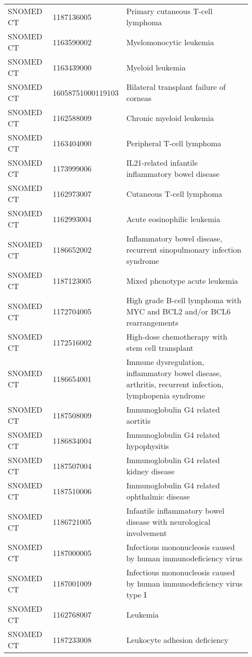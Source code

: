 \begin{longtable}{p{}p{}p{}}
  SNOMED CT & 1187136005 & Primary cutaneous T-cell lymphoma \\ 
  SNOMED CT & 1163590002 & Myelomonocytic leukemia \\ 
  SNOMED CT & 1163439000 & Myeloid leukemia \\ 
  SNOMED CT & 16058751000119103 & Bilateral transplant failure of corneas \\ 
  SNOMED CT & 1162588009 & Chronic myeloid leukemia \\ 
  SNOMED CT & 1163404000 & Peripheral T-cell lymphoma \\ 
  SNOMED CT & 1173999006 & IL21-related infantile inflammatory bowel disease \\ 
  SNOMED CT & 1162973007 & Cutaneous T-cell lymphoma \\ 
  SNOMED CT & 1162993004 & Acute eosinophilic leukemia \\ 
  SNOMED CT & 1186652002 & Inflammatory bowel disease, recurrent sinopulmonary infection syndrome \\ 
  SNOMED CT & 1187123005 & Mixed phenotype acute leukemia \\ 
  SNOMED CT & 1172704005 & High grade B-cell lymphoma with MYC and BCL2 and/or BCL6 rearrangements \\ 
  SNOMED CT & 1172516002 & High-dose chemotherapy with stem cell transplant \\ 
  SNOMED CT & 1186654001 & Immune dysregulation, inflammatory bowel disease, arthritis, recurrent infection, lymphopenia syndrome \\ 
  SNOMED CT & 1187508009 & Immunoglobulin G4 related aortitis \\ 
  SNOMED CT & 1186834004 & Immunoglobulin G4 related hypophysitis \\ 
  SNOMED CT & 1187507004 & Immunoglobulin G4 related kidney disease \\ 
  SNOMED CT & 1187510006 & Immunoglobulin G4 related ophthalmic disease \\ 
  SNOMED CT & 1186721005 & Infantile inflammatory bowel disease with neurological involvement \\ 
  SNOMED CT & 1187000005 & Infectious mononucleosis caused by human immunodeficiency virus \\ 
  SNOMED CT & 1187001009 & Infectious mononucleosis caused by human immunodeficiency virus type I \\ 
  SNOMED CT & 1162768007 & Leukemia \\ 
  SNOMED CT & 1187233008 & Leukocyte adhesion deficiency \\ 

\end{longtable}
